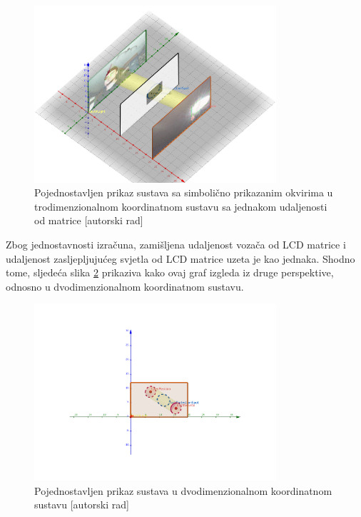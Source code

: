 \documentclass{foi}
\begin{document}
\begin{figure}[h!]
    \centering
    \includegraphics[width=0.8\textwidth]{slike/sustav6}
    \caption{Pojednostavljen prikaz sustava sa simbolično prikazanim okvirima u trodimenzionalnom koordinatnom sustavu sa jednakom udaljenosti od matrice [autorski rad]}
    \label{fig:sustav6}
\end{figure}

Zbog jednostavnosti izračuna, zamišljena udaljenost vozača od LCD matrice i udaljenost zasljepljujućeg svjetla od LCD matrice uzeta je kao jednaka. Shodno tome, sljedeća slika \ref{fig:sustav4} prikaziva kako ovaj graf izgleda iz druge perspektive, odnosno u dvodimenzionalnom koordinatnom sustavu.

\begin{figure}[h!]
    \centering
    \includegraphics[width=0.8\textwidth]{slike/sustav4}
    \caption{Pojednostavljen prikaz sustava u dvodimenzionalnom koordinatnom sustavu [autorski rad]}
    \label{fig:sustav4}
\end{figure}
\end{document}
